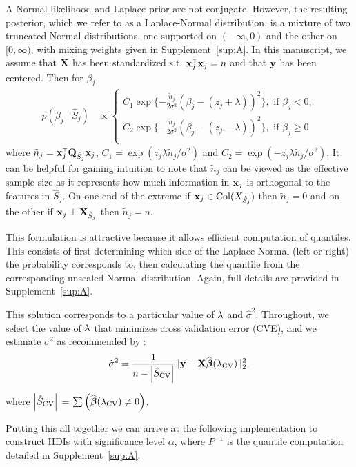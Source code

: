 A Normal likelihood and Laplace prior are not conjugate. However, the resulting posterior, which we refer to as a Laplace-Normal distribution, is a mixture of two truncated Normal distributions, one supported on $(-\infty, 0)$ and the other on $[0, \infty)$, with mixing weights given in Supplement~\ref{sup:A}. In this manuscript, we assume that $\mathbf{X}$ has been standardized s.t. $\mathbf{x}_j ^{\scriptscriptstyle\top}\mathbf{x}_j = n$ and that $\mathbf{y}$ has been centered. Then for $\beta_j$,
\begin{align}
  \label{eq:fcp}
  p(\beta_j \mid \hat{S}_j) &\propto
  \begin{cases}
    C_{1} \exp\{-\frac{\tilde{n}_j}{2\sigma^2} (\beta_j - (z_j + \lambda))^2\}, \text{ if } \beta_j < 0, \\
    C_{2} \exp\{-\frac{\tilde{n}_j}{2\sigma^2} (\beta_j - (z_j - \lambda))^2\}, \text{ if } \beta_j \geq 0 \\
  \end{cases}
\end{align}
where $\tilde{n}_j = \mathbf{x}_j ^{\scriptscriptstyle\top} \mathbf{Q}_{\hat{S}_j} \mathbf{x}_j$, $C_{1} = \exp(z_j \lambda \tilde{n}_j/\sigma^2)$ and $C_{2} = \exp(-z_j \lambda \tilde{n}_j/\sigma^2)$. It can be helpful for gaining intuition to note that $\tilde{n}_j$ can be viewed as the effective sample size as it represents how much information in $\mathbf{x}_j$ is orthogonal to the features in $\hat{S}_j$. On one end of the extreme if $\mathbf{x}_j \in \mathrm{Col}(X_{\hat{S}_j})$ then $\tilde{n}_j = 0$ and on the other if $\mathbf{x}_j \perp \mathbf{X}_{\hat{S}_j}$ then $\tilde{n}_j = n$.

This formulation is attractive because it allows efficient computation of quantiles. This consists of first determining which side of the Laplace-Normal (left or right) the probability corresponds to, then calculating the quantile from the corresponding unscaled Normal distribution. Again, full details are provided in Supplement~\ref{sup:A}.

This solution corresponds to a particular value of $\lambda$ and $\hat{\sigma}^2$. Throughout, we select the value of $\lambda$ that minimizes cross validation error (CVE), and we estimate $\sigma^2$ as recommended by \cite{Reid2016}:
$$
\hat{\sigma}^2 = \frac{1}{n - \left\lvert\hat{S}_{\textrm{CV}}\right\rvert} \lVert\mathbf{y} - \mathbf{X}\widehat{\boldsymbol{\beta}}({\lambda_{\textrm{CV}}})\rVert_2^2,
$$

\noindent where $\left\lvert\hat{S}_{\textrm{CV}}\right\rvert$ = $\sum \left( \widehat{\boldsymbol{\beta}}({\lambda_{\textrm{CV}}}) \neq 0 \right)$.

Putting this all together we can arrive at the following implementation to construct HDIs with significance level $\alpha$, where $P^{-1}$ is the quantile computation detailed in Supplement~\ref{sup:A}.


